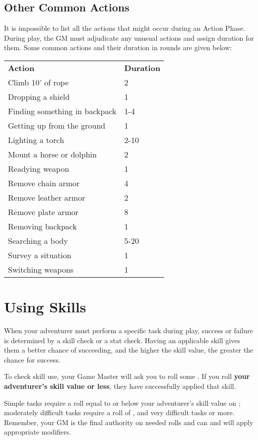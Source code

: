 \begin{multicols*}{2}
\subsection{Other Common Actions}
It is impossible to list all the actions that might occur during an Action Phase. During play, the GM must adjudicate any unusual actions and assign duration for them. Some common actions and their duration in rounds are given below:
\begin{normbox}
\begin{tabular}{l l}
\textbf{Action} & \textbf{Duration}\\
Climb 10' of rope & 2\\
Dropping a shield & 1\\
Finding something in backpack & 1-4\\
Getting up from the ground & 1\\
Lighting a torch & 2-10\\
Mount a horse or dolphin & 2\\
Readying weapon & 1\\
Remove chain armor & 4\\
Remove leather armor & 2\\
Remove plate armor & 8\\
Removing backpack & 1\\
Searching a body & 5-20\\
Survey a situation & 1\\
Switching weapons & 1\\
\end{tabular}
\end{normbox}
\section{Using Skills}
When your adventurer must perform a specific task during play, success or failure is determined by a skill check or a stat check. Having an applicable skill gives them a better chance of succeeding, and the higher the skill value, the greater the chance for success.

To check skill use, your Game Master will ask you to roll some . If you roll \textbf{your adventurer's skill value or less}, they have successfully applied that skill.

Simple tasks require a roll equal to or below your adventurer's skill value on ; moderately difficult tasks require a roll of , and very difficult tasks  or more. Remember, your GM is the final authority on needed rolls and can and will apply appropriate modifiers.

\end{multicols*}

